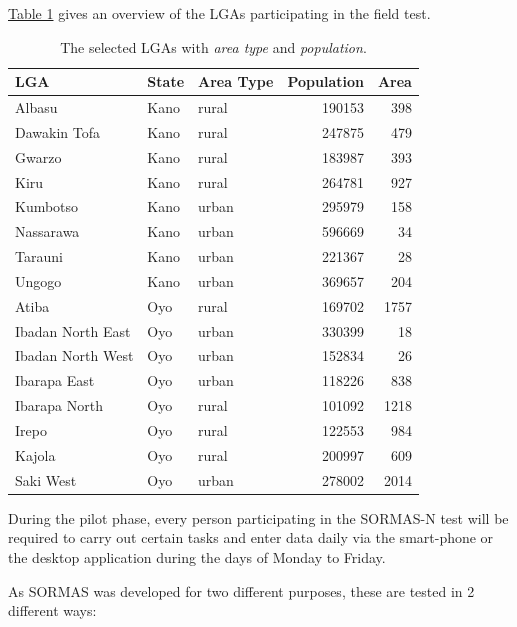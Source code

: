 \documentclass[a4paper, titlepage]{tufte-handout}
\begin{document}
\hyperref[tab:lgas]{Table 1} gives an overview of the LGAs participating in the field test.

\begin{table}[htb]
\caption{\label{tab:lgas}The selected LGAs with \emph{area type} and \emph{population}.}
\begin{tabular}{l|l|l|r|r}
\toprule
LGA & State & Area Type & Population & Area\\
\midrule
Albasu & Kano & rural & 190153 & 398\\
Dawakin Tofa & Kano & rural & 247875 & 479\\
Gwarzo & Kano & rural & 183987 & 393\\
Kiru & Kano & rural & 264781 & 927\\
Kumbotso & Kano & urban & 295979 & 158\\
Nassarawa & Kano & urban & 596669 & 34\\
Tarauni & Kano & urban & 221367 & 28\\
Ungogo & Kano & urban & 369657 & 204\\
Atiba & Oyo & rural & 169702 & 1757\\
Ibadan North East & Oyo & urban & 330399 & 18\\
Ibadan North West & Oyo & urban & 152834 & 26\\
Ibarapa East & Oyo & urban & 118226 & 838\\
Ibarapa North & Oyo & rural & 101092 & 1218\\
Irepo & Oyo & rural & 122553 & 984\\
Kajola & Oyo & rural & 200997 & 609\\
Saki West & Oyo & urban & 278002 & 2014\\
\bottomrule
\end{tabular}
\end{table}
\medskip


During the pilot phase, every person participating in the SORMAS-N test will be required to carry out certain tasks and enter data daily via the smart-phone or the desktop application during the days of Monday to Friday.

As SORMAS was developed for two different purposes, these are tested in 2 different ways:
\end{document}
